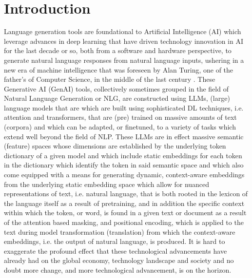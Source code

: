 \documentclass[final]{clv2025}
\begin{document}
\begin{abstract}
computational cost increase of some 4398.07$\%$ compared to the static embedding DL approaches we test - CNN, LSTM and ATTN based DL classifiers, following \cite{moreo} - and a 4126.02$\%$ increase in computation time relative to our ML classifiers that we benchmark. In short, the data and findings which we produce within the context of this research should give pause to researchers and practitioners alike to make sure that the performance gains they expect to achieve by using the bigger and more advanced language models (LLMs) are indeed worth the additional cost in terms of time and computational resources necessary to achieve said gains.
\end{abstract}

\section{Introduction}

Language generation tools are foundational to Artificial Intelligence (AI) which leverage advances in deep learning that have driven technology innovation in AI for the last decade or so, both from a software and hardware perspective, to generate natural language responses from natural language inputs, ushering in a new era of machine intelligence that was foreseen by Alan Turing, one of the father's of Computer Science, in the middle of the last century \cite{turingmind1950} \cite{jones2025largelanguagemodelspass}. These Generative AI (GenAI) tools, collectively sometimes grouped in the field of Natural Language Generation or NLG, are constructed using LLMs, (large) language models that are which are built using sophisticated DL techniques, i.e. attention and transformers, that are (pre) trained on massive amounts of text (corpora) and which can be adapted, or finetuned, to a variety of tasks which extend well beyond the field of NLP. These LLMs are in effect massive semantic (feature) spaces whose dimensions are established by the underlying token dictionary of a given model and which include static embeddings for each token in the dictionary which identify the token in said semantic space and which also come equipped with a means for generating dynamic, context-aware embeddings from the underlying static embedding space which allow for nuanced representations of text, i.e. natural language, that is both rooted in the lexicon of the language itself as a result of pretraining, and in addition the specific context within which the token, or word, is found in a given text or document as a result of the attention based masking, and positional encoding, which is applied to the text during model transformation (translation) from which the context-aware embeddings, i.e. the output of natural language, is produced. It is hard to exaggerate the profound effect that these technological advancements have already had on the global economy, technology landscape and society and no doubt more change, and more technological advancement, is on the horizon.
\end{document}
